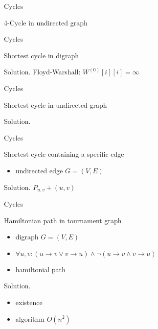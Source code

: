 \begin{frame}{Cycles}
  \begin{exampleblock}{4-Cycle in undirected graph }
    
  \end{exampleblock}
\end{frame}
\begin{frame}{Cycles}
  \begin{exampleblock}{Shortest cycle in digraph }
    
  \end{exampleblock}

  \begin{block}{Solution.}
    Floyd-Warshall: $W^{(0)}[i][i] = \infty$
  \end{block}
\end{frame}
\begin{frame}{Cycles}
  \begin{exampleblock}{Shortest cycle in undirected graph }
    
  \end{exampleblock}
  \begin{block}{Solution.}
    
  \end{block}
\end{frame}
\begin{frame}{Cycles}
  \begin{exampleblock}{Shortest cycle containing a specific edge }
    \begin{itemize}
      \item undirected edge $G = (V, E)$
    \end{itemize}
  \end{exampleblock}

  \begin{block}{Solution.}
    $P_{u,v} + (u,v)$ 
  \end{block}
\end{frame}
\begin{frame}{Cycles}
  \begin{exampleblock}{Hamiltonian path in tournament graph }
    \begin{itemize}
      \item digraph $G = (V, E)$
      \item $\forall u,v: (u \to v \lor v \to u) \land \lnot (u \to v \land v \to u)$
      \item hamiltonial path
    \end{itemize}
  \end{exampleblock}

  \begin{block}{Solution.}
    \begin{itemize}
      \item existence
      \item algorithm $O(n^{2})$
    \end{itemize}
  \end{block}
\end{frame}
